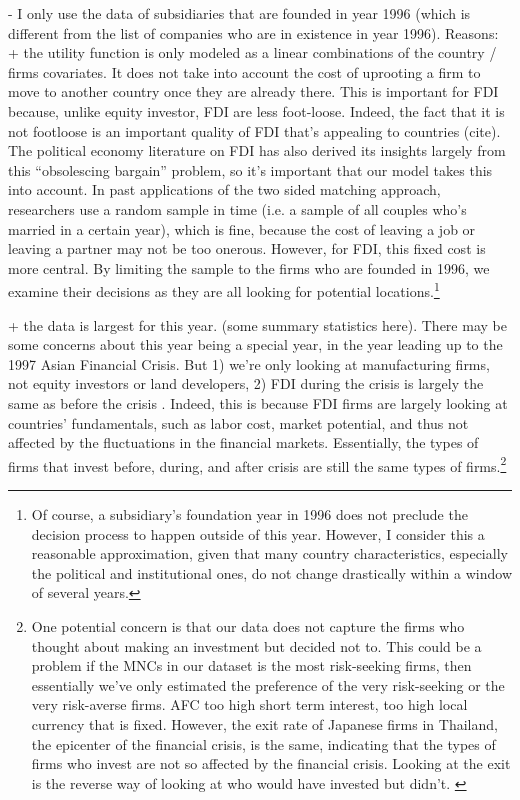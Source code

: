 - I only use the data of subsidiaries that are founded in year 1996 (which is
different from the list of companies who are in existence in year 1996).
Reasons: + the utility function is only modeled as a linear combinations of the
country / firms covariates. It does not take into account the cost of uprooting
a firm to move to another country once they are already there. This is important
for FDI because, unlike equity investor, FDI are less foot-loose. Indeed, the
fact that it is not footloose is an important quality of FDI that's appealing to
countries (cite). The political economy literature on FDI has also derived its
insights largely from this ``obsolescing bargain'' problem, so it's important
that our model takes this into account. In past applications of the two sided
matching approach, researchers use a random sample in time (i.e. a sample of all
couples who's married in a certain year), which is fine, because the cost of
leaving a job or leaving a partner may not be too onerous. However, for FDI,
this fixed cost is more central. By limiting the sample to the firms who are
founded in 1996, we examine their decisions as they are all looking for
potential locations.\footnote{Of course, a subsidiary's foundation year in 1996
does not preclude the decision process to happen outside of this year. However,
I consider this a reasonable approximation, given that many country
characteristics, especially the political and institutional ones, do not change
drastically within a window of several years.}

+ the data is largest for this year. (some summary statistics here). There may
be some concerns about this year being a special year, in the year leading up to
the 1997 Asian Financial Crisis. But 1) we're only looking at manufacturing
firms, not equity investors or land developers, 2) FDI during the crisis is
largely the same as before the crisis \citep{UNCTAD1998}. Indeed, this is
because FDI firms are largely looking at countries' fundamentals, such as labor
cost, market potential, and thus not affected by the fluctuations in the
financial markets. Essentially, the types of firms that invest before, during,
and after crisis are still the same types of firms.\footnote{One potential
concern is that our data does not capture the firms who thought about making an
investment but decided not to. This could be a problem if the MNCs in our
dataset is the most risk-seeking firms, then essentially we've only estimated
the preference of the very risk-seeking or the very risk-averse firms. AFC too
high short term interest, too high local currency that is fixed. However, the
exit rate of Japanese firms in Thailand, the epicenter of the financial crisis,
is the same, indicating that the types of firms who invest are not so affected
by the financial crisis. Looking at the exit is the reverse way of looking at
who would have invested but didn't. \citep{Delios2001}}

